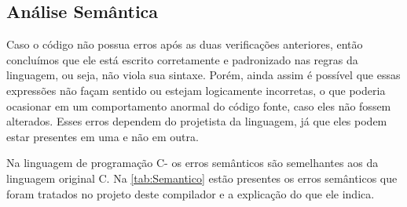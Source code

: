 \documentclass[
	12pt,				%
	oneside,
	a4paper,			%
	english,			%
	french,				%
	spanish,			%
	brazil,				%
	]{abntex2}
\begin{document}
\subsection{Análise Semântica}

Caso o código não possua erros após as duas verificações anteriores, então concluímos que ele está escrito corretamente e padronizado nas regras da linguagem, ou seja, não viola sua sintaxe. Porém, ainda assim é possível que essas expressões não façam sentido ou estejam logicamente incorretas, o que poderia ocasionar em um comportamento anormal do código fonte, caso eles não fossem alterados. Esses erros dependem do projetista da linguagem, já que eles podem estar presentes em uma e não em outra.

Na linguagem de programação C- os erros semânticos são semelhantes aos da linguagem original C. Na \autoref{tab:Semantico} estão presentes os erros semânticos que foram tratados no projeto deste compilador e a explicação do que ele indica.
\end{document}
